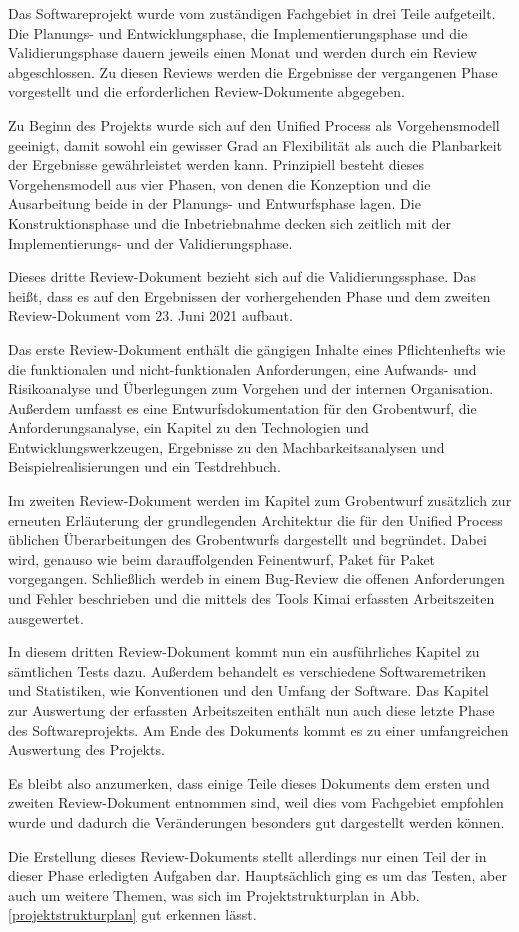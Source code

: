 \documentclass[../review_3.tex]{subfiles}
\begin{document}
Das Softwareprojekt wurde vom zuständigen Fachgebiet in drei Teile aufgeteilt. Die Planungs- und Entwicklungsphase, die Implementierungsphase und die Validierungsphase dauern jeweils einen Monat und werden durch ein Review abgeschlossen. Zu diesen Reviews werden die Ergebnisse der vergangenen Phase vorgestellt und die erforderlichen Review-Dokumente abgegeben.

Zu Beginn des Projekts wurde sich auf den Unified Process als Vorgehensmodell geeinigt, damit sowohl ein gewisser Grad an Flexibilität als auch die Planbarkeit der Ergebnisse gewährleistet werden kann. Prinzipiell besteht dieses Vorgehensmodell aus vier Phasen, von denen die Konzeption und die Ausarbeitung beide in der Planungs- und Entwurfsphase lagen. Die Konstruktionsphase und die Inbetriebnahme decken sich zeitlich mit der Implementierungs- und der Validierungsphase.

Dieses dritte Review-Dokument bezieht sich auf die Validierungssphase. Das heißt, dass es auf den Ergebnissen der vorhergehenden Phase und dem zweiten Review-Dokument vom 23. Juni 2021 aufbaut.

Das erste Review-Dokument enthält die gängigen Inhalte eines Pflichtenhefts wie die funktionalen und nicht-funktionalen Anforderungen, eine Aufwands- und Risikoanalyse und Überlegungen zum Vorgehen und der internen Organisation. Außerdem umfasst es eine Entwurfsdokumentation für den Grobentwurf, die Anforderungsanalyse, ein Kapitel zu den Technologien und Entwicklungswerkzeugen, Ergebnisse zu den Machbarkeitsanalysen und Beispielrealisierungen und ein Testdrehbuch.

Im zweiten Review-Dokument werden im Kapitel zum Grobentwurf zusätzlich zur erneuten Erläuterung der grundlegenden Architektur die für den Unified Process üblichen Überarbeitungen des Grobentwurfs dargestellt und begründet. Dabei wird, genauso wie beim darauffolgenden Feinentwurf, Paket für Paket vorgegangen. Schließlich werdeb in einem Bug-Review die offenen Anforderungen und Fehler beschrieben und die mittels des Tools Kimai erfassten Arbeitszeiten ausgewertet.

In diesem dritten Review-Dokument kommt nun ein ausführliches Kapitel zu sämtlichen Tests dazu. Außerdem behandelt es verschiedene Softwaremetriken und Statistiken, wie Konventionen und den Umfang der Software. Das Kapitel zur Auswertung der erfassten Arbeitszeiten enthält nun auch diese letzte Phase des Softwareprojekts. Am Ende des Dokuments kommt es zu einer umfangreichen Auswertung des Projekts.

Es bleibt also anzumerken, dass einige Teile dieses Dokuments dem ersten und zweiten Review-Dokument entnommen sind, weil dies vom Fachgebiet empfohlen wurde und dadurch die Veränderungen besonders gut dargestellt werden können.

Die Erstellung dieses Review-Dokuments stellt allerdings nur einen Teil der in dieser Phase erledigten Aufgaben dar. Hauptsächlich ging es um das Testen, aber auch um weitere Themen, was sich im Projektstrukturplan in Abb. \ref{projektstrukturplan} gut erkennen lässt.
\end{document}
